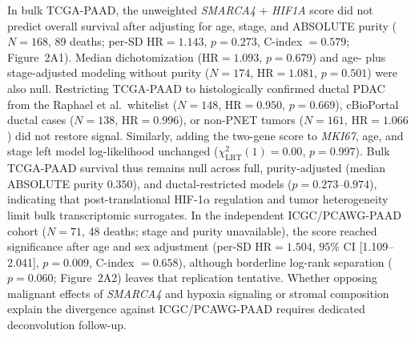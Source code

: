 \documentclass[10pt,twocolumn]{article}
\begin{document}
In bulk TCGA-PAAD, the unweighted \textit{SMARCA4} + \textit{HIF1A} score did not predict overall survival after adjusting for age, stage, and ABSOLUTE purity ($N = 168$, 89 deaths; per-SD $\text{HR} = 1.143$, $p = 0.273$, C-index $= 0.579$; Figure~2A1). Median dichotomization ($\text{HR} = 1.093$, $p = 0.679$) and age- plus stage-adjusted modeling without purity ($N = 174$, $\text{HR} = 1.081$, $p = 0.501$) were also null. Restricting TCGA-PAAD to histologically confirmed ductal PDAC from the Raphael et al.\ whitelist \cite{raphael2017} ($N = 148$, $\text{HR} = 0.950$, $p = 0.669$), cBioPortal ductal cases ($N = 138$, $\text{HR} = 0.996$), or non-PNET tumors ($N = 161$, $\text{HR} = 1.066$) did not restore signal. Similarly, adding the two-gene score to \textit{MKI67}, age, and stage left model log-likelihood unchanged ($\chi^2_{\text{LRT}}(1) = 0.00$, $p = 0.997$). Bulk TCGA-PAAD survival thus remains null across full, purity-adjusted (median ABSOLUTE purity $0.350$), and ductal-restricted models ($p = 0.273\text{--}0.974$), indicating that post-translational HIF-1$\alpha$ regulation and tumor heterogeneity limit bulk transcriptomic surrogates. In the independent ICGC/PCAWG-PAAD cohort ($N = 71$, 48 deaths; stage and purity unavailable), the score reached significance after age and sex adjustment (per-SD $\text{HR} = 1.504$, $95\%$ CI [1.109--2.041], $p = 0.009$, C-index $= 0.658$), although borderline log-rank separation ($p = 0.060$; Figure~2A2) leaves that replication tentative. Whether opposing malignant effects of \textit{SMARCA4} and hypoxia signaling or stromal composition explain the divergence against ICGC/PCAWG-PAAD requires dedicated deconvolution follow-up.
\end{document}
